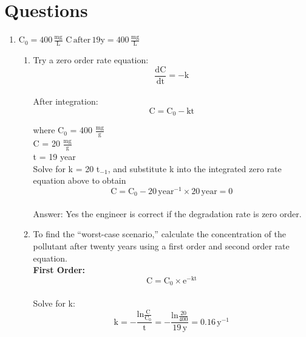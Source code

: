 \documentclass[12pt,letterpaper]{article}
\begin{document}
\section *{Questions}
\begin{enumerate}
\item 
$\mathrm{C_0 = 400\, \frac{mg}{L}}$
$\mathrm{C \, after\, 19 y = 400\, \frac{mg}{L}}$
\begin{enumerate}

\item Try a zero order rate equation:
\begin{equation*}
\mathrm{\frac{dC}{dt} = -k}
\end{equation*}\\

After integration:\\

\begin{equation*}
\mathrm{C = C_0 -kt}
\end{equation*}

where C$_0$ = 400 $\mathrm{\frac{mg}{g}}$\\
C = 20 $\mathrm{\frac{mg}{g}}$\\
t = 19 year\\

Solve for k = 20 t$_{-1}$, and substitute k into the integrated zero rate equation above to obtain\\

\begin{equation*}
\mathrm{C = C_0 -20\, year^{-1}\times 20 \, year = 0}
\end{equation*}\\

Answer: Yes the engineer is correct if the degradation rate is zero order.

\item To find the ``worst-case scenario,'' calculate the concentration of the pollutant after twenty years using a first order and second order rate equation.\\

\textbf{First Order:}\\

\begin{equation*}
\mathrm{C = C_0\times e^{-kt}}
\end{equation*}\\

Solve for k:\\

\begin{equation*}
\mathrm{k = -\frac{ln\frac{C}{C_0}}{t} = -\frac{ln\frac{20}{400}}{19\, y} = 0.16 \, y^{-1}}
\end{equation*}\\


\end{enumerate}
\end{enumerate}
\end{document}
